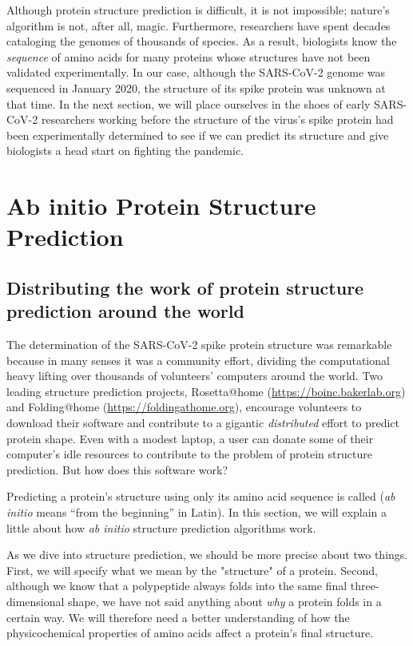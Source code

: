 Although protein structure prediction is difficult, it is not impossible; nature's algorithm is not, after all, magic. Furthermore, researchers have spent decades cataloging the genomes of thousands of species. As a result, biologists know the \textit{sequence} of amino acids for many proteins whose structures have not been validated experimentally. In our case, although the SARS-CoV-2 genome was sequenced in January 2020, the structure of its spike protein was unknown at that time.  In the next section, we will place ourselves in the shoes of early SARS-CoV-2 researchers working before the structure of the virus's spike protein had been experimentally determined to see if we can predict its structure and give biologists a head start on fighting the pandemic.


\FloatBarrier
{}

\section{Ab initio Protein Structure Prediction}
\label{sec:ab_initio}
\subsection{Distributing the work of protein structure prediction around the world}

The determination of the SARS-CoV-2 spike protein structure was remarkable because in many senses it was a community effort, dividing the computational heavy lifting over thousands of volunteers' computers around the world. Two leading structure prediction projects, Rosetta@home (\url{https://boinc.bakerlab.org}) and Folding@home (\url{https://foldingathome.org}), encourage volunteers to download their software and contribute to a gigantic \textit{distributed} effort to predict protein shape. Even with a modest laptop, a user can donate some of their computer's idle resources to contribute to the problem of protein structure prediction. But how does this software work?

Predicting a protein’s structure using only its amino acid sequence is called  (\textit{ab initio} means “from the beginning” in Latin). In this section, we will explain a little about how \textit{ab initio} structure prediction algorithms work.

As we dive into structure prediction, we should be more precise about two things. First, we will specify what we mean by the "structure" of a protein. Second, although we know that a polypeptide always folds into the same final three-dimensional shape, we have not said anything about \textit{why} a protein folds in a certain way. We will therefore need a better understanding of how the physicochemical properties of amino acids affect a protein's final structure.

